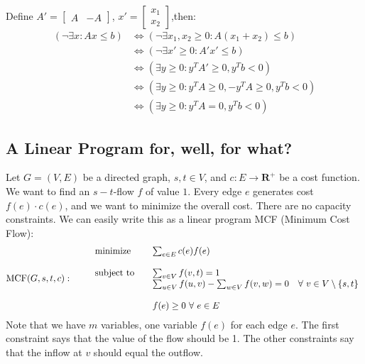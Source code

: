 \documentclass[11pt,a4paper,oneside]{article}
\newcommand{\x}{\mathbf{x}}
\begin{document}
\begin{problem}{1}
	Define $A'=\begin{bmatrix}A & -A\end{bmatrix}$,
	$x'=\begin{bmatrix}x_1\\x_2\end{bmatrix}$,then:
	$$	
	\begin {align*}
	(\neg\exists x:Ax\leq b)
	& \Longleftrightarrow (\neg\exists x_1,x_2\geq 0:A(x_1+x_2)\leq b)\\
	& \Longleftrightarrow (\neg\exists x'\geq 0:A'x'\leq b)\\
	& \Longleftrightarrow (\exists y\geq 0:y^TA'\geq 0,y^Tb<0)\\
	& \Longleftrightarrow (\exists y\geq 0:y^TA\geq 0,-y^TA\geq 0,y^Tb<0)\\
	& \Longleftrightarrow (\exists y\geq 0:y^TA= 0,y^Tb<0)
	\end {align*}
	$$
\end{problem}

\subsection{A Linear Program for, well, for what?}

Let $G = (V,E)$ be a directed graph, $s,t \in V$,  and $c: E \rightarrow \mathbf{R}^+$ be a cost 
function. We want to find an $s-t$-flow $f$ of value $1$. Every edge $e$ generates cost $f(e) \cdot c(e)$, and we want to minimize the overall cost. There are no capacity constraints.
We can easily write this as a linear program MCF (Minimum Cost Flow):
\begin{align*}
  \textrm{MCF}(G,s,t,c): \qquad
  \begin{array}{ll}
    \textnormal{minimize} \quad & \multicolumn{1}{l}{\sum_{e \in E} c(e) f(e)} \\
    \\
    \textnormal{subject to} \quad & \sum_{v \in V} f(v,t)  = 1 \\
					        & \sum_{u \in V} f(u,v) - \sum_{w \in V} f(v,w)  = 0  \quad \forall\ v \in V  \setminus \{s,t\}\\
					        \\
     & f(e)  \geq 0 \ \forall \ e \in E 
  \end{array}
\end{align*}
Note that we have $m$ variables, one variable $f(e)$ for each edge $e$.
The first constraint says that the value of the flow should be 1. The other constraints say that 
the inflow at $v$ should equal the outflow.
\end{document}
